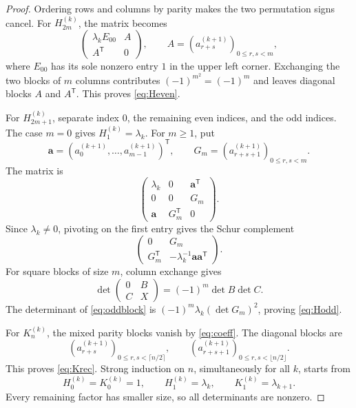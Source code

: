 \documentclass{amsart}
\numberwithin{equation}{section}
\begin{document}
\begin{proof}
Ordering rows and columns by parity makes the two permutation signs cancel.
For $H_{2m}^{(k)}$, the matrix becomes
\[
\begin{pmatrix}\lambda_k E_{00}&A\\ A^{\mathsf T}&0\end{pmatrix},
\qquad A=(a_{r+s}^{(k+1)})_{0\le r,s<m},
\]
where $E_{00}$ has its sole nonzero entry $1$ in the upper left corner.
Exchanging the two blocks of $m$ columns contributes
$(-1)^{m^2}=(-1)^m$ and leaves diagonal blocks $A$ and
$A^{\mathsf T}$. This proves \eqref{eq:Heven}.

For $H_{2m+1}^{(k)}$, separate index $0$, the remaining even indices,
and the odd indices. The case $m=0$ gives $H_1^{(k)}=\lambda_k$.
For $m\ge1$, put
\[
\boldsymbol a=(a_0^{(k+1)},\ldots,a_{m-1}^{(k+1)})^{\mathsf T},\qquad
G_m=(a_{r+s+1}^{(k+1)})_{0\le r,s<m}.
\]
The matrix is
\begin{equation}\label{eq:oddblock}
\begin{pmatrix}
\lambda_k&0&\boldsymbol a^{\mathsf T}\\
0&0&G_m\\
\boldsymbol a&G_m^{\mathsf T}&0
\end{pmatrix}.
\end{equation}
Since $\lambda_k\ne0$, pivoting on the first entry gives the Schur
complement
\[
\begin{pmatrix}0&G_m\\G_m^{\mathsf T}&-\lambda_k^{-1}
\boldsymbol a\boldsymbol a^{\mathsf T}\end{pmatrix}.
\]
For square blocks of size $m$, column exchange gives
\begin{equation}\label{eq:blockidentity}
\det\begin{pmatrix}0&B\\C&X\end{pmatrix}
=(-1)^m\det B\det C.
\end{equation}
The determinant of \eqref{eq:oddblock} is
$(-1)^m\lambda_k(\det G_m)^2$, proving \eqref{eq:Hodd}.

For $K_n^{(k)}$, the mixed parity blocks vanish by \eqref{eq:coeff}.
The diagonal blocks are
\[
(a_{r+s}^{(k+1)})_{0\le r,s<\lceil n/2\rceil},\qquad
(a_{r+s+1}^{(k+1)})_{0\le r,s<\lfloor n/2\rfloor}.
\]
This proves \eqref{eq:Krec}. Strong induction on $n$, simultaneously
for all $k$, starts from
\[
H_0^{(k)}=K_0^{(k)}=1,\qquad H_1^{(k)}=\lambda_k,\qquad
K_1^{(k)}=\lambda_{k+1}.
\]
Every remaining factor has smaller size, so all determinants are nonzero.
\end{proof}
\end{document}

